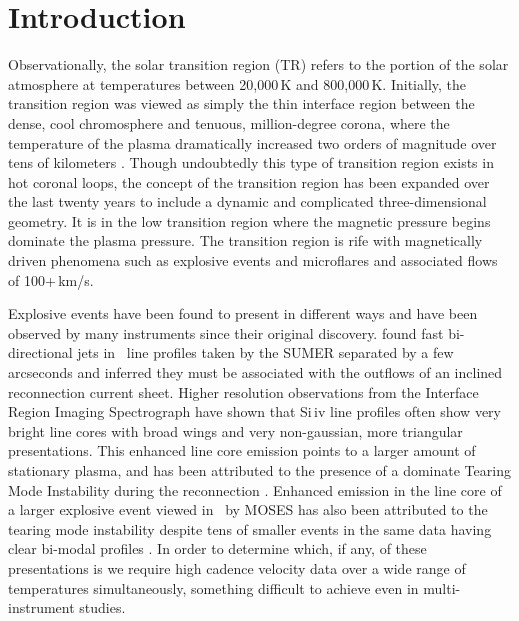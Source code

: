 \section{Introduction}

    Observationally, the solar transition region (TR) refers to the portion of the solar atmosphere at temperatures between 20,000\,K and 800,000\,K. 
    Initially, the transition region was viewed as simply the thin interface region between the dense, cool chromosphere and tenuous, million-degree corona, where the temperature of the plasma dramatically increased two orders of magnitude over tens of kilometers \citep[see][and references therein]{tian2017}. 
    Though undoubtedly this type of transition region exists in hot coronal loops, the concept of the transition region has been expanded over the last twenty years to include a dynamic and complicated three-dimensional geometry. 
    It is in the low transition region where the magnetic pressure begins dominate the plasma pressure. The transition region is rife with magnetically driven phenomena such as explosive events \cite[e.g.,][]{dere1991} and microflares \citep{gontikakis2012} and associated flows of 100+\,km/s.
    
    Explosive events have been found to present in different ways and have been observed by many instruments since their original discovery.
    \citet{innes1997} found fast bi-directional jets in \siiv \ line profiles taken by the  SUMER \citep{SUMER} separated by a few arcseconds and inferred they must be associated with the outflows of an inclined reconnection current sheet.
    Higher resolution observations from the Interface Region Imaging Spectrograph \citep[IRIS]{depontieu2014} have shown that Si\,{\sc iv} line profiles often show very bright line cores with broad wings and very non-gaussian, more triangular presentations.
    This enhanced line core emission points to a larger amount of stationary plasma, and has been attributed to the presence of a dominate Tearing Mode Instability during the reconnection \citep{Innes2015}.
    Enhanced emission in the line core of a larger explosive event viewed in \heii \ by MOSES has also been attributed to the tearing mode instability \citep{Fox10} despite tens of smaller events in the same data having clear bi-modal profiles \citep{Rust2019}.
    In order to determine which, if any, of these presentations is  we require high cadence velocity data over a wide range of temperatures simultaneously, something difficult to achieve even in multi-instrument studies.
    
